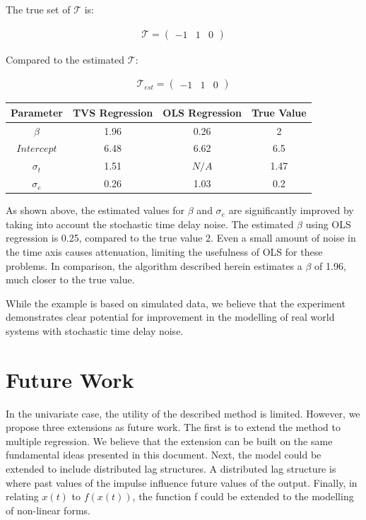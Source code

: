 \documentclass[11pt]{amsart}
\begin{document}
The true set of $\mathcal{T}$ is:

\begin{align}
\mathcal{T} = 
\left(
\begin{array}{ccc}
-1 & 1 & 0 
\end{array}  
\right)
\end{align}

Compared to the estimated $\mathcal{T}$:

\begin{align}
\mathcal{T}_{est} = 
\left(
\begin{array}{ccc}
-1 & 1 & 0 
\end{array}  
\right)
\end{align}



\begin{tabular}{c|c|c|c|}
\hline
Parameter & TVS Regression & OLS Regression & True Value \\
\hline
$\beta$ & 1.96 & 0.26 & 2  \\
\hline
$Intercept$ & 6.48 & 6.62 & 6.5 \\
\hline
$\sigma_t$ & 1.51 & $N/A$ & 1.47 \\
\hline
$\sigma_e$ & 0.26 & 1.03 & 0.2 \\
\end{tabular}

As shown above, the estimated values for $\beta$ and $\sigma_e$ are significantly improved by taking into account the stochastic time delay noise. The estimated $\beta$ using OLS regression is 0.25, compared to the true value 2. Even a small amount of noise in the time axis causes attenuation, 
limiting the usefulness of OLS for these problems.
In comparison, the algorithm described herein estimates a $\beta$ of 1.96, much closer to the true value.

While the example is based on simulated data, we believe that the experiment demonstrates clear potential for improvement in the modelling of real world systems with stochastic time delay noise.


\section{Future Work}

In the univariate case, the utility of the described method is limited. However, we propose three extensions as future work. The first is to extend the method to multiple regression. We believe that the extension can be built on the same fundamental ideas presented in this document. Next, the model could be extended to include distributed lag structures. A distributed lag structure is where past values of the impulse influence future values of the output. Finally, in relating $x(t)$ to $f(x(t))$, the function f could be extended to the modelling of non-linear forms.
\end{document}

